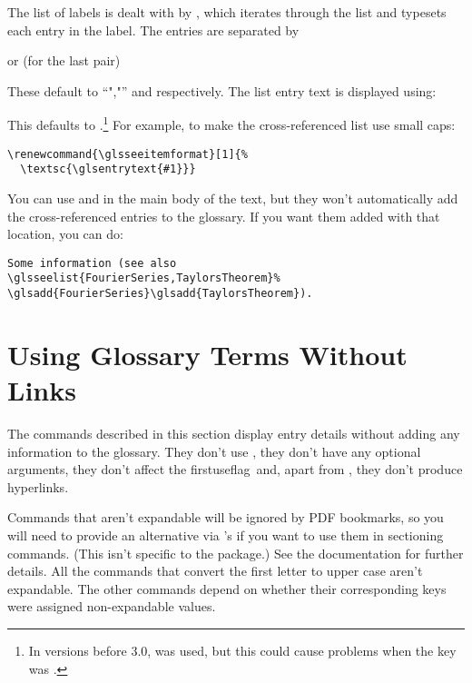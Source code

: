 \documentclass[report,inlinetitle]{nlctdoc}
\let\glsd\glsuseri
\newcommand*{\firstuseflag}{\gls{firstuseflag}}
\newcommand*{\gloskey}[2][newglossaryentry]{\csopt{#1}{#2}}
\begin{document}
The list of labels is dealt with by , which iterates
through the list and typesets each entry in the label. The entries
are separated by
\begin{definition}[\DescribeMacro{\glsseesep}]
\end{definition}
or (for the last pair)
\begin{definition}[\DescribeMacro{\glsseelastsep}]
\end{definition}
These default to ``",\space"'' and
 respectively. The list entry text
is displayed using:
\begin{definition}[\DescribeMacro{\glsseeitemformat}]
\end{definition}
This defaults to .\footnote{In
versions before 3.0,  was used, but this could cause
problems when the \gloskey{name} key was \glsd{sanitize}.} For example, to
make the cross-referenced list use small caps:
\begin{verbatim}
\renewcommand{\glsseeitemformat}[1]{%
  \textsc{\glsentrytext{#1}}}
\end{verbatim}

\begin{important}
You can use  and  in the main body
of the text, but they won't automatically add the cross-referenced
entries to the glossary. If you want them added with that location,
you can do:
\begin{verbatim}
Some information (see also 
\glsseelist{FourierSeries,TaylorsTheorem}%
\glsadd{FourierSeries}\glsadd{TaylorsTheorem}).
\end{verbatim}
\end{important}

\chapter{Using Glossary Terms Without Links}
\label{sec:glsnolink}

The commands described in this section display entry details without
adding any information to the glossary. They don't use
, they don't have any optional arguments, they
don't affect the \firstuseflag\ and, apart from ,
they don't produce hyperlinks.

\begin{important}
Commands that aren't expandable will be ignored by PDF bookmarks, so
you will need to provide an alternative via 's
 if you want to use them in sectioning commands.
(This isn't specific to the  package.) See the
 documentation for further details. All the commands
that convert the first letter to upper case aren't expandable.
The other commands depend on whether their corresponding keys were
assigned non-expandable values.
\end{important}
\end{document}
